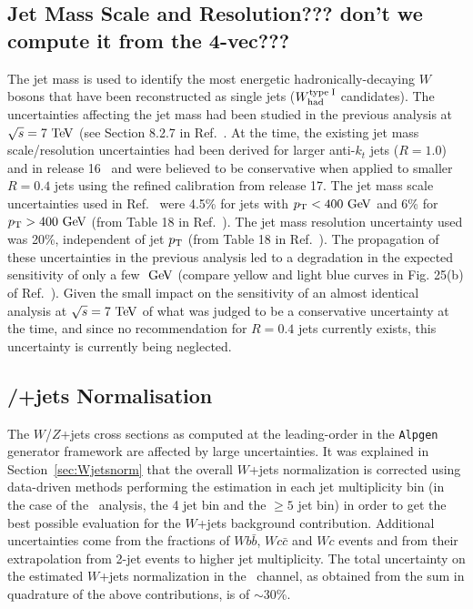 \subsection{Jet Mass Scale and Resolution??? don't we compute it from the 4-vec???}
The jet mass is used  to identify the most energetic hadronically-decaying $W$ bosons that have been reconstructed as  single jets
($W_{\rm had}^{\rm type\;I}$ candidates). The uncertainties affecting the jet mass had been studied in the previous analysis at $\sqrt{s}=7\tev$ 
(see Section  8.2.7 in Ref.~\cite{atlas_WbWb_5fb_ljets_backup}. At the time, the existing jet mass scale/resolution uncertainties had been derived for larger anti-$k_t$ jets 
($R=1.0$) and in release 16~\cite{jet_mass_2011} and were believed to be conservative when applied to smaller $R=0.4$ jets using the 
refined calibration from release 17.  The jet mass scale uncertainties used in Ref.~\cite{atlas_WbWb_5fb_ljets_backup} were
4.5\% for jets with $\pt<400\gev$ and 6\% for $\pt>400\gev$ (from Table 18 in Ref.~\cite{jet_mass_2011}). The jet mass resolution
uncertainty used was 20\%, independent of jet $\pt$ (from Table 18 in Ref.~\cite{jet_mass_2011}). 
The propagation of these uncertainties in the previous analysis led to a degradation in the expected sensitivity of only a few $\gev$
(compare yellow and light blue curves in Fig. 25(b) of Ref.~\cite{atlas_WbWb_5fb_ljets_backup}). Given the small impact on the
sensitivity of an almost identical analysis at $\sqrt{s}=7\tev$ of what was judged to be a conservative uncertainty at the time, and since
no recommendation for  $R=0.4$ jets currently exists,  this uncertainty is currently being neglected.

\subsection{\Wboson/\Zboson+jets Normalisation}
\label{sec:syst_vjetsnormWBX}
The $W$/$Z$+jets cross sections as computed at the
leading-order in the
\texttt{Alpgen} generator framework
are affected by large uncertainties.
It was explained in Section~\ref{sec:Wjetsnorm}
that the overall $W$+jets normalization is 
corrected using data-driven methods 
performing the estimation in each jet multiplicity
bin (in the case of the \wbx\ analysis, the 4 jet bin
and the $\geq 5$ jet bin) in order to get the best
possible evaluation for the $W$+jets background contribution.
Additional uncertainties come from the fractions of $Wb\bar{b}$, $Wc\bar{c}$ and $Wc$
events and from their extrapolation from 2-jet events to higher jet multiplicity. 
The total uncertainty on the estimated $W$+jets normalization
in the \tight\ channel, as obtained from the  sum in quadrature 
of the above contributions, is of $\sim$30\%.



